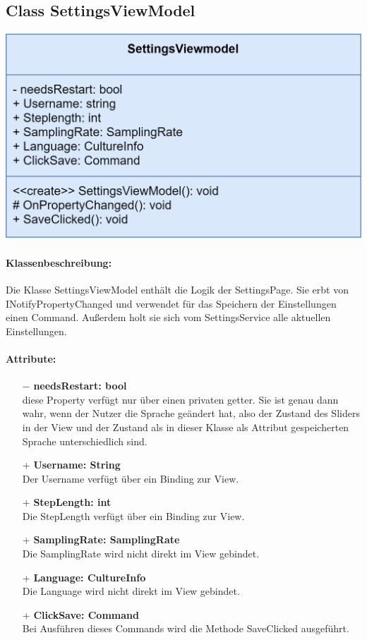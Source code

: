 \documentclass[a4paper,12pt]{article}
\begin{document}
\begin{minipage}[b]{0.7\textwidth}

	\subsection{Class SettingsViewModel}
\end{minipage}
\begin{minipage}[c]{0.3\textwidth}
	\includegraphics[width=\textwidth]{bilder/ViewmodelKlassen/SettingsViewModel.png}
\end{minipage}
\paragraph{Klassenbeschreibung:}
Die Klasse SettingsViewModel enthält die Logik der SettingsPage. Sie erbt von INotifyPropertyChanged und verwendet für das Speichern der Einstellungen einen Command. Außerdem holt sie sich vom SettingsService alle aktuellen Einstellungen.
\paragraph{Attribute:}
\begin{itemize}
	\item[$-$] \textbf{needsRestart: bool}\\ diese Property verfügt nur über einen privaten getter. Sie ist genau dann wahr, wenn der Nutzer die Sprache geändert hat, also der Zustand des Sliders in der View und der Zustand als in dieser Klasse als Attribut gespeicherten Sprache unterschiedlich sind.
	\item[+] \textbf{Username: String}\\Der Username verfügt über ein Binding zur View.
	\item[+] \textbf{StepLength: int}\\Die StepLength verfügt über ein Binding zur View. 
	\item[+] \textbf{SamplingRate: SamplingRate}\\Die SamplingRate wird nicht direkt im View gebindet.
	\item[+] \textbf{Language: CultureInfo}\\Die Language wird nicht direkt im View gebindet. 
	\item[+] \textbf{ClickSave: Command}\\Bei Ausführen dieses Commands wird die Methode SaveClicked ausgeführt. 
\end{itemize}
\end{document}
